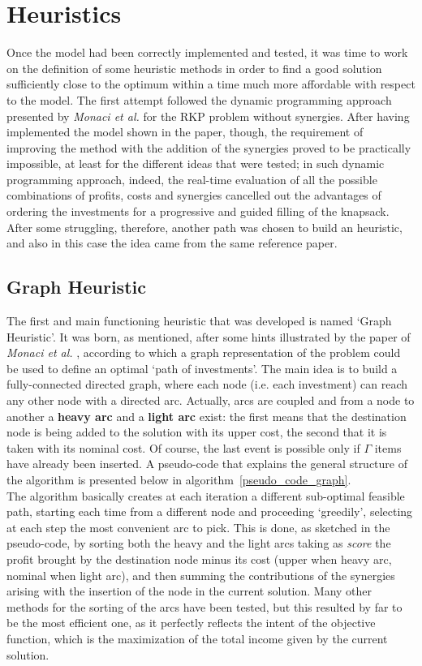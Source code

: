 \documentclass{article}
\begin{document}
\section{Heuristics}
Once the model had been correctly implemented and tested, it was time to work on the definition of some heuristic methods in order to find a good solution sufficiently close to the optimum within a time much more affordable with respect to the model. The first attempt followed the dynamic programming approach presented by \textit{Monaci et al.} \cite{Monaci} for the RKP problem without synergies. After having implemented the model shown in the paper, though, the requirement of improving the method with the addition of the synergies proved to be practically impossible, at least for the different ideas that were tested; in such dynamic programming approach, indeed, the real-time evaluation of all the possible combinations of profits, costs and synergies cancelled out the advantages of ordering the investments for a progressive and guided filling of the knapsack. 
After some struggling, therefore, another path was chosen to build an heuristic, and also in this case the idea came from the same reference paper.
\subsection{Graph Heuristic}
The first and main functioning heuristic that was developed is named `Graph Heuristic'. It was born, as mentioned, after some hints illustrated by the paper of  \textit{Monaci et al.} \cite{Monaci}, according to which a graph representation of the problem could be used to define an optimal `path of investments'. The main idea is to build a fully-connected directed graph, where each node (i.e. each investment) can reach any other node with a directed arc. Actually, arcs are coupled and from a node to another a \textbf{heavy arc} and a \textbf{light arc} exist: the first means that the destination node is being added to the solution with its upper cost, the second that it is taken with its nominal cost.
Of course, the last event is possible only if $\Gamma$ items have already been inserted. A pseudo-code that explains the general structure of the algorithm is presented below in algorithm~\ref{pseudo_code_graph}. \\

The algorithm basically creates at each iteration a different sub-optimal feasible path, starting each time from a different node and proceeding `greedily', selecting at each step the most convenient arc to pick. This is done, as sketched in the pseudo-code, by sorting both the heavy and the light arcs taking as \textit{score} the profit brought by the destination node minus its cost (upper when heavy arc, nominal when light arc), and then summing the contributions of the synergies arising with the insertion of the node in the current solution. Many other methods for the sorting of the arcs have been tested, but this resulted by far to be the most efficient one, as it perfectly reflects the intent of the objective function, which is the maximization of the total income given by the current solution. \\
\end{document}
